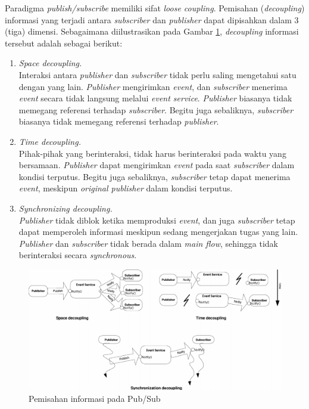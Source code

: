 Paradigma \textit{publish/subscribe} memiliki sifat \textit{loose coupling}. Pemisahan (\textit{decoupling}) informasi yang terjadi antara \textit{subscriber} dan \textit{publisher} dapat dipisahkan dalam 3 (tiga) dimensi. Sebagaimana diilustrasikan pada Gambar \ref{fig:space-time-sync-decoupling}, \textit{decoupling} informasi tersebut adalah sebagai berikut:

\begin{enumerate}
\item \textit{Space decoupling.} \\
Interaksi antara \textit{publisher} dan \textit{subscriber} tidak perlu saling mengetahui satu dengan yang lain. \textit{Publisher} mengirimkan \textit{event}, dan \textit{subscriber} menerima \textit{event} secara tidak langsung melalui \textit{event service}. \textit{Publisher} biasanya tidak memegang referensi terhadap \textit{subscriber}. Begitu juga sebaliknya, \textit{subscriber} biasanya tidak memegang referensi terhadap \textit{publisher}.
\item \textit{Time decoupling.} \\
Pihak-pihak yang berinteraksi, tidak harus berinteraksi pada waktu yang bersamaan. \textit{Publisher} dapat mengirimkan \textit{event} pada saat \textit{subscriber} dalam kondisi terputus. Begitu juga sebaliknya, \textit{subscriber} tetap dapat menerima \textit{event}, meskipun \textit{original publisher} dalam kondisi terputus.
\item \textit{Synchronizing decoupling.} \\
\textit{Publisher} tidak diblok ketika memproduksi \textit{event}, dan juga \textit{subscriber} tetap dapat memperoleh informasi meskipun sedang mengerjakan tugas yang lain. \textit{Publisher} dan \textit{subscriber} tidak berada dalam \textit{main flow}, sehingga tidak berinteraksi secara \textit{synchronous}.
\end{enumerate}


\begin{figure}[!]
	\centering
	\includegraphics[width=\textwidth]{Resources/Images/space-time-sync-decoupling}
	\caption{Pemisahan informasi pada Pub/Sub \citep{eugster_many_2003}}
	\label{fig:space-time-sync-decoupling}
\end{figure}
